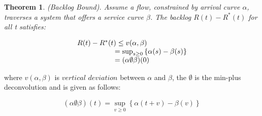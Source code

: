 \documentclass[a4paper]{article}
\newtheorem{theorem}{Theorem}
\begin{document}
\begin{theorem}
(Backlog Bound). Assume a flow, constrained by arrival curve $\alpha$, traverses a system that offers a service curve $\beta$. The backlog $R(t) - {R^*}(t)$ for all t satisfies:

\begin{equation}\label{}
  \begin{array}{l}
    R(t) - {R^*}(t) \le v(\alpha ,\beta )\\
    {\kern 1pt} {\kern 1pt} {\kern 1pt} {\kern 1pt} {\kern 1pt} {\kern 1pt} {\kern 1pt} {\kern 1pt} {\kern 1pt} {\kern 1pt} {\kern 1pt} {\kern 1pt} {\kern 1pt} {\kern 1pt} {\kern 1pt} {\kern 1pt} {\kern 1pt} {\kern 1pt} {\kern 1pt} {\kern 1pt} {\kern 1pt} {\kern 1pt} {\kern 1pt} {\kern 1pt} {\kern 1pt} {\kern 1pt} {\kern 1pt} {\kern 1pt} {\kern 1pt} {\kern 1pt} {\kern 1pt} {\kern 1pt} {\kern 1pt} {\kern 1pt} {\kern 1pt} {\kern 1pt} {\kern 1pt} {\kern 1pt} {\kern 1pt} {\kern 1pt} {\kern 1pt} {\kern 1pt} {\kern 1pt} {\kern 1pt} {\kern 1pt} {\kern 1pt} {\kern 1pt} {\kern 1pt} {\kern 1pt} {\kern 1pt}  = {\sup _{s \ge 0}}\left\{ {\alpha (s) - \beta (s)} \right\}\\
    {\kern 1pt} {\kern 1pt} {\kern 1pt} {\kern 1pt} {\kern 1pt} {\kern 1pt} {\kern 1pt} {\kern 1pt} {\kern 1pt} {\kern 1pt} {\kern 1pt} {\kern 1pt} {\kern 1pt} {\kern 1pt} {\kern 1pt} {\kern 1pt} {\kern 1pt} {\kern 1pt} {\kern 1pt} {\kern 1pt} {\kern 1pt} {\kern 1pt} {\kern 1pt} {\kern 1pt} {\kern 1pt} {\kern 1pt} {\kern 1pt} {\kern 1pt} {\kern 1pt} {\kern 1pt} {\kern 1pt} {\kern 1pt} {\kern 1pt} {\kern 1pt} {\kern 1pt} {\kern 1pt} {\kern 1pt} {\kern 1pt} {\kern 1pt} {\kern 1pt} {\kern 1pt} {\kern 1pt} {\kern 1pt} {\kern 1pt} {\kern 1pt} {\kern 1pt} {\kern 1pt} {\kern 1pt} {\kern 1pt} {\kern 1pt}  = (\alpha  \emptyset \beta )(0)
  \end{array}
\end{equation}

\end{theorem}

\noindent where $v(\alpha ,\beta )$ is $vertical$ $deviation$ between $\alpha$ and $\beta$, the $\emptyset$ is the min-plus deconvolution and is given as follows:

\begin{equation}\label{}
  (\alpha  \emptyset \beta )(t) = {\sup _{v \ge 0}}\left\{ {\alpha (t + v) - \beta (v)} \right\}
\end{equation}
\end{document}
